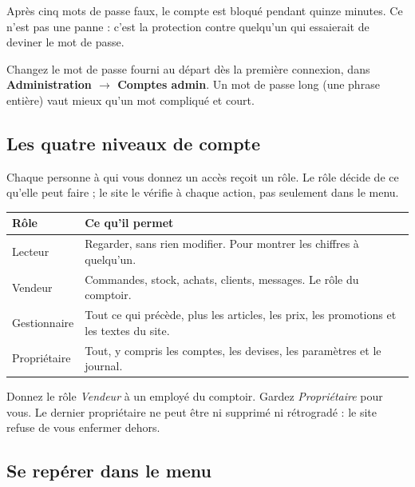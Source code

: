 \documentclass[11pt,a4paper]{article}
\newcommand{\menu}[1]{\textsf{\textbf{#1}}}
\begin{document}
\begin{attention}
Après cinq mots de passe faux, le compte est bloqué pendant quinze minutes.
Ce n'est pas une panne : c'est la protection contre quelqu'un qui essaierait
de deviner le mot de passe.
\end{attention}

\begin{conseil}
Changez le mot de passe fourni au départ dès la première connexion, dans
\menu{Administration $\rightarrow$ Comptes admin}. Un mot de passe long
(une phrase entière) vaut mieux qu'un mot compliqué et court.
\end{conseil}

\subsection{Les quatre niveaux de compte}

Chaque personne à qui vous donnez un accès reçoit un rôle. Le rôle décide de
ce qu'elle peut faire ; le site le vérifie à chaque action, pas seulement dans
le menu.

\begin{center}
\begin{tabularx}{\textwidth}{@{}lX@{}}
\toprule
\textbf{Rôle} & \textbf{Ce qu'il permet} \\
\midrule
Lecteur & Regarder, sans rien modifier. Pour montrer les chiffres à quelqu'un. \\
Vendeur & Commandes, stock, achats, clients, messages. Le rôle du comptoir. \\
Gestionnaire & Tout ce qui précède, plus les articles, les prix, les promotions et les textes du site. \\
Propriétaire & Tout, y compris les comptes, les devises, les paramètres et le journal. \\
\bottomrule
\end{tabularx}
\end{center}

\begin{conseil}
Donnez le rôle \textit{Vendeur} à un employé du comptoir. Gardez
\textit{Propriétaire} pour vous. Le dernier propriétaire ne peut être ni
supprimé ni rétrogradé : le site refuse de vous enfermer dehors.
\end{conseil}

\subsection{Se repérer dans le menu}
\end{document}
